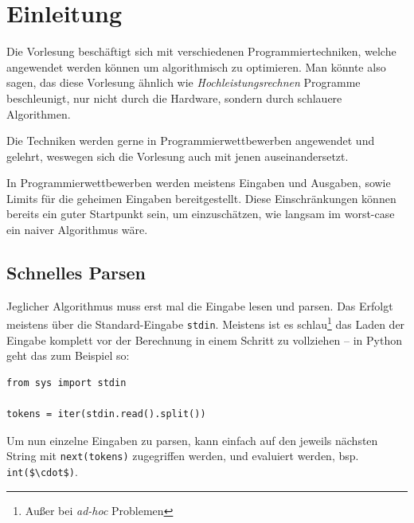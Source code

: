 \section{Einleitung}
Die Vorlesung beschäftigt sich mit verschiedenen Programmiertechniken, welche angewendet werden können um algorithmisch zu optimieren.
Man könnte also sagen, das diese Vorlesung ähnlich wie \emph{Hochleistungsrechnen} Programme beschleunigt, nur nicht durch die Hardware, sondern durch schlauere Algorithmen.

Die Techniken werden gerne in Programmierwettbewerben angewendet und gelehrt, weswegen sich die Vorlesung auch mit jenen auseinandersetzt.

In Programmierwettbewerben werden meistens Eingaben und Ausgaben, sowie Limits für die geheimen Eingaben bereitgestellt.
Diese Einschränkungen können bereits ein guter Startpunkt sein, um einzuschätzen, wie langsam im worst-case ein naiver Algorithmus wäre.

\subsection{Schnelles Parsen}
Jeglicher Algorithmus muss erst mal die Eingabe lesen und parsen.
Das Erfolgt meistens über die Standard-Eingabe \lstinline|stdin|.
Meistens ist es schlau\footnote{Außer bei \emph{ad-hoc} Problemen} das Laden der Eingabe komplett vor der Berechnung in einem Schritt zu vollziehen -- in Python geht das zum Beispiel so:
\begin{lstlisting}
from sys import stdin

tokens = iter(stdin.read().split())
\end{lstlisting}
Um nun einzelne Eingaben zu parsen, kann einfach auf den jeweils nächsten String mit \lstinline|next(tokens)| zugegriffen werden, und evaluiert werden, bsp. \lstinline|int($\cdot$)|.


